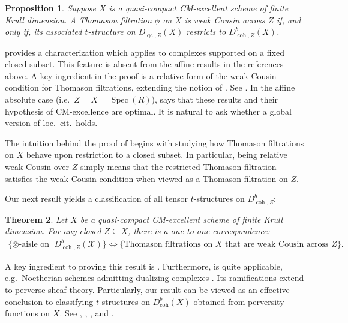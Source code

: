 \documentclass[11pt]{amsart}
\theoremstyle{plain}
\newtheorem{theorem}{Theorem}[section]
\newtheorem{proposition}[theorem]{Proposition}
\theoremstyle{definition}
\numberwithin{equation}{section}
\numberwithin{theorem}{section}
\begin{document}
\begin{proposition}
    \label{prop:weak_cousin_cm_excellent_stalks}
    Suppose $X$ is a quasi-compact CM-excellent scheme of finite Krull dimension. A Thomason filtration $\phi$ on $X$ is weak Cousin across $Z$ if, and only if, its associated $t$-structure on $D_{\operatorname{qc},Z}(X)$ restricts to $D^b_{\operatorname{coh},Z}(X)$.
\end{proposition}

 provides a characterization which applies to complexes supported on a fixed closed subset. This feature is absent from the affine results in the references above. A key ingredient in the proof is a relative form of the weak Cousin condition for Thomason filtrations, extending the notion of \cite{AlonsoTarrio/JeremiasLopez/Saorin:2010}. See . In the affine absolute case (i.e.\ $Z=X=\operatorname{Spec}(R)$), \cite[Corollary 5.6]{Hrbek/Martini:2024} says that these results and their hypothesis of CM-excellence are optimal. It is natural to ask whether a global version of loc.\ cit.\ holds.

The intuition behind the proof of  begins with studying how Thomason filtrations on $X$ behave upon restriction to a closed subset. In particular, being relative weak Cousin over $Z$ simply means that the restricted Thomason filtration satisfies the weak Cousin condition when viewed as a Thomason filtration on $Z$. 

Our next result yields a classification of all tensor $t$-structures on $D^b_{\operatorname{coh},Z}$:

\begin{theorem}
    \label{thm:weak_cousin_cm_excellent_stalks}
    Let $X$ be a quasi-compact CM-excellent scheme of finite Krull dimension. For any closed $Z\subseteq X$, there is a one-to-one correspondence:
    \begin{displaymath}
        \begin{aligned}
            \{ \otimes\textrm{-aisle on } & D^b_{\operatorname{coh},Z}(\mathcal{X})\} 
            \iff \{ \textrm{Thomason filtrations on } X \textrm{ that are weak Cousin across } Z \}.
        \end{aligned}
    \end{displaymath}
\end{theorem}

A key ingredient to proving this result is . Furthermore,  is quite applicable, e.g.\ Noetherian schemes admitting dualizing complexes . Its ramifications extend to perverse sheaf theory. Particularly, our result can be viewed as an effective conclusion to classifying $t$-structures on $D^b_{\operatorname{coh}}(X)$ obtained from perversity functions on $X$. See \cite{Arikin/Bezrukavnikov:2010}, \cite[Theorem 9.1]{Gabber:2004}, \cite[Theorem 5.9]{Kashiwara:2004}, and \cite{Sahoo:2024}.
\end{document}
